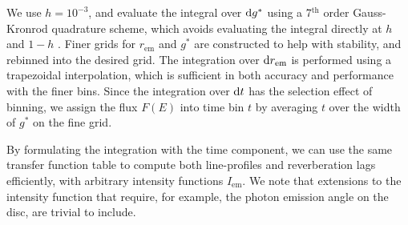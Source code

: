 We use $h = 10^{-3}$, and evaluate the integral over $\text{d} g^\ast$ using a 7$^\text{th}$ order Gauss-Kronrod quadrature scheme, which avoids evaluating the integral directly at $h$ and $1 - h$ \citep{}. Finer grids for $r_\text{em}$ and $g^\ast$ are constructed to help with stability, and rebinned into the desired grid. The integration over $\text{d} r_\text{em}$ is performed using a trapezoidal interpolation, which is sufficient in both accuracy and performance with the finer bins. Since the integration over $\text{d} t$ has the selection effect of binning, we assign the flux $F(E)$ into time bin $t$ by averaging $t$ over the width of $g^\ast$ on the fine grid.


By formulating the integration with the time component, we can use the same transfer function table to compute both line-profiles and reverberation lags efficiently, with arbitrary intensity functions $I_\text{em}$. We note that extensions to the intensity function that require, for example, the photon emission angle on the disc, are trivial to include.

